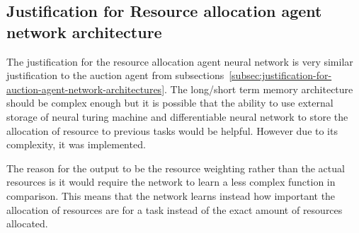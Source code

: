 \subsection{Justification for Resource allocation agent network architecture}\label{subsec:justification-for-resource-allocation-agent-network-architecture}
The justification for the resource allocation agent neural network is very similar justification to the auction agent from
subsections~\ref{subsec:justification-for-auction-agent-network-architectures}. The long/short term memory architecture should be
complex enough but it is possible that the ability to use external storage of neural turing machine and differentiable
neural network to store the allocation of resource to previous tasks would be helpful. However due to its complexity,
it was implemented.

The reason for the output to be the resource weighting rather than the actual resources is it would require the network
to learn a less complex function in comparison. This means that the network learns instead how important the allocation
of resources are for a task instead of the exact amount of resources allocated.
